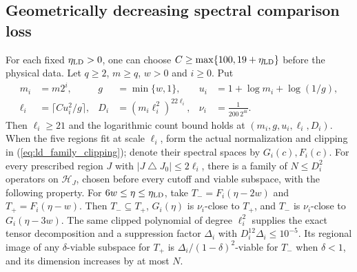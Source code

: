 \subsection{Geometrically decreasing spectral comparison loss}

\begin{lemma}
    \label{lem:dyadic_regional_low_energy_family}
    \leanok
    For each fixed $\eta_{\rm LD}>0$, one can choose
    $C\ge\max\{100,19+\eta_{\rm LD}\}$ before the physical data.
    Let $q\ge2$, $m\ge q$, $w>0$ and $i\ge0$. Put
    \begin{align*}
        m_i    & =m2^i,                     & g & =\min\{w,1\}, &
        u_i    & =1+\log m_i+\log(1/g),                           \\
        \ell_i & =\lceil Cu_i^2/g\rceil,    &
        D_i    & =(m_i\ell_i^2)^{22\ell_i}, &
        \nu_i  & =\frac1{200\,2^{4i}}.
    \end{align*}
    Then $\ell_i\ge21$ and the logarithmic count bound holds at
    $(m_i,g,u_i,\ell_i,D_i)$. When the five regions fit at scale $\ell_i$,
    form the actual normalization and clipping in
    (\ref{eq:ld_family_clipping}); denote their spectral spaces by
    $G_i(c),F_i(c)$. For every prescribed region $J$ with
    $|J\mathbin{\triangle} J_0|\le2\ell_i$, there is a family of
    $N\le D_i^2$ operators on $\mathcal H_J$, chosen before every cutoff
    and viable subspace, with the following property.
    For $6w\le\eta\le\eta_{\rm LD}$, take
    $T_-=F_i(\eta-2w)$ and $T_+=F_i(\eta-w)$.
    Then $T_-\subseteq T_+$, $G_i(\eta)$ is $\nu_i$-close to $T_+$,
    and $T_-$ is $\nu_i$-close to $G_i(\eta-3w)$.
    The same clipped polynomial of degree $\ell_i^2$ supplies the exact
    tensor decomposition and a suppression factor $\Delta_i$ with
    $D_i^{12}\Delta_i\le10^{-5}$. Its regional image of any
    $\delta$-viable subspace for $T_+$ is
    $\Delta_i/(1-\delta)^2$-viable for $T_-$ when $\delta<1$,
    and its dimension increases by at most $N$.
\end{lemma}
